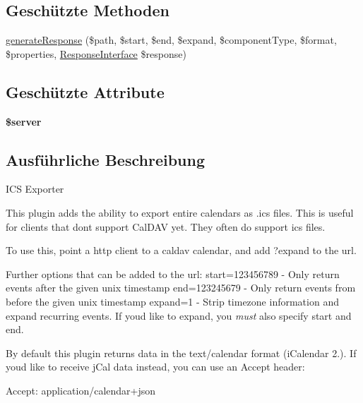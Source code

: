 \subsection*{Geschützte Methoden}
\begin{DoxyCompactItemize}
\item 
\mbox{\hyperlink{class_sabre_1_1_cal_d_a_v_1_1_i_c_s_export_plugin_abd3c2a8067834cb0e301e4fd0efb3521}{generate\+Response}} (\$path, \$start, \$end, \$expand, \$component\+Type, \$format, \$properties, \mbox{\hyperlink{interface_sabre_1_1_h_t_t_p_1_1_response_interface}{Response\+Interface}} \$response)
\end{DoxyCompactItemize}
\subsection*{Geschützte Attribute}
\begin{DoxyCompactItemize}
\item 
\mbox{\label{class_sabre_1_1_cal_d_a_v_1_1_i_c_s_export_plugin_ae977761de0cc2a4cbe65717b06264023}} 
{\bfseries \$server}
\end{DoxyCompactItemize}


\subsection{Ausführliche Beschreibung}
I\+CS Exporter

This plugin adds the ability to export entire calendars as .ics files. This is useful for clients that don\textquotesingle{}t support Cal\+D\+AV yet. They often do support ics files.

To use this, point a http client to a caldav calendar, and add ?expand to the url.

Further options that can be added to the url\+: start=123456789 -\/ Only return events after the given unix timestamp end=123245679 -\/ Only return events from before the given unix timestamp expand=1 -\/ Strip timezone information and expand recurring events. If you\textquotesingle{}d like to expand, you {\itshape must} also specify start and end.

By default this plugin returns data in the text/calendar format (i\+Calendar 2.). If you\textquotesingle{}d like to receive j\+Cal data instead, you can use an Accept header\+:

Accept\+: application/calendar+json

